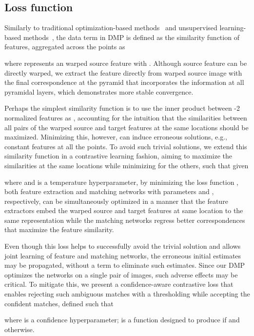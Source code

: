 \documentclass[10pt,twocolumn,letterpaper]{article}
\begin{document}
\subsection{Loss function}\label{sec:3_3}
Similarly to traditional optimization-based methods~\cite{liu2010sift,kim2017dctm} and unsupervised learning-based methods~\cite{rocco2018end,kim2019semantic}, the data term in DMP is defined as the similarity function  of features, aggregated across the points  as

where  represents an warped source feature with . Although source feature can be directly warped, we extract the feature directly from warped source image  with the final correspondence  at the pyramid that incorporates the information at all pyramidal layers, which demonstrates more stable convergence.

Perhaps the simplest similarity function is to use the inner product between -2 normalized features as ,
accounting for the intuition that the similarities between all pairs of the warped source and target features at the same locations should be maximized. Minimizing this, however, can induce erroneous solutions, e.g., constant features at all the points. To avoid such trivial solutions, we extend this similarity function in a contrastive learning fashion, aiming to maximize the similarities at the same locations while minimizing for the others, such that given

where  and  is a temperature hyperparameter, 
by minimizing the loss function , both feature extraction and matching networks with parameters  and , respectively, can be simultaneously optimized in a manner that the feature extractors embed the warped source and target features at same location to the same representation while the matching networks regress better correspondences that maximize the feature similarity. 

Even though this loss helps to successfully avoid the trivial solution and allows joint learning of feature and matching networks, the erroneous initial estimates may be propagated, without a term to eliminate such estimates. Since our DMP optimizes the networks on a single pair of images, such adverse effects may be critical. To mitigate this, we present a confidence-aware contrastive loss that enables rejecting such ambiguous matches with a thresholding while accepting the confident matches, defined such that



where  is a confidence hyperparameter;  is a function designed to produce  if  and  otherwise.
\end{document}
